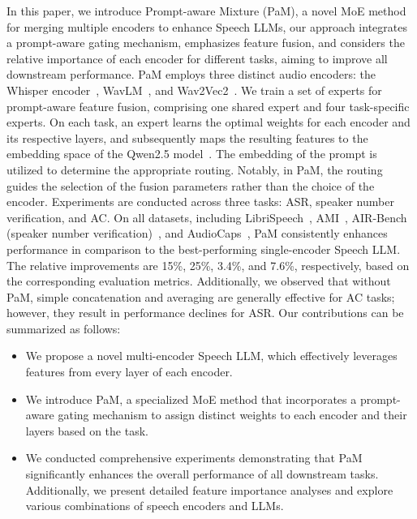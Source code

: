 In this paper, we introduce Prompt-aware Mixture (PaM), a novel MoE method for merging multiple encoders to enhance Speech LLMs, our approach integrates a prompt-aware gating mechanism, emphasizes feature fusion, and considers the relative importance of each encoder for different tasks, aiming to improve all downstream performance. PaM employs three distinct audio encoders: the Whisper encoder~\cite{radford2022robust}, WavLM~\cite{chen2021wavlm}, and Wav2Vec2~\cite{baevski2020wav2vec}. We train a set of experts for prompt-aware feature fusion, comprising one shared expert and four task-specific experts. On each task, an expert learns the optimal weights for each encoder and its respective layers, and subsequently maps the resulting features to the embedding space of the Qwen2.5 model~\cite{qwen2.5}. The embedding of the prompt is utilized to determine the appropriate routing. Notably, in PaM, the routing guides the selection of the fusion parameters rather than the choice of the encoder. Experiments are conducted across three tasks: ASR, speaker number verification, and AC. On all datasets, including LibriSpeech~\cite{panayotov2015librispeech}, AMI~\cite{kraaij2005ami}, AIR-Bench (speaker number verification)~\cite{yang2024air}, and AudioCaps~\cite{audiocaps}, PaM consistently enhances performance in comparison to the best-performing single-encoder Speech LLM. The relative improvements are 15\%, 25\%, 3.4\%, and 7.6\%, respectively, based on the corresponding evaluation metrics. Additionally, we observed that without PaM, simple concatenation and averaging are generally effective for AC tasks; however, they result in performance declines for ASR. Our contributions can be summarized as follows:
\begin{itemize}

\item We propose a novel multi-encoder Speech LLM, which effectively leverages features from every layer of each encoder.
\item We introduce PaM, a specialized MoE method that incorporates a prompt-aware gating mechanism to assign distinct weights to each encoder and their layers based on the task.
\item We conducted comprehensive experiments demonstrating that PaM significantly enhances the overall performance of all downstream tasks. Additionally, we present detailed feature importance analyses and explore various combinations of speech encoders and LLMs. 

\end{itemize}

